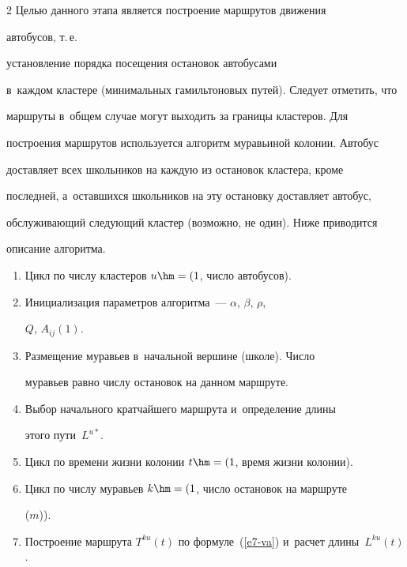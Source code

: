 \begin{multicols}{2}
     Целью данного этапа является построение маршрутов движения

автобусов, т.\,е.\

установление порядка посещения остановок автобусами

в~каж\-дом кластере (минимальных гамильтоновых путей). Следует отметить, что

маршруты в~общем случае могут выходить за границы кластеров. Для

по\-стро\-ения маршрутов используется алгоритм муравьиной колонии. Автобус

доставляет всех школьников на каждую из остановок кластера, кроме

последней, а~оставшихся школьников на эту остановку до\-став\-ля\-ет автобус,

обслуживающий следующий кластер (возможно, не один). Ниже приводится

описание алгоритма.

     \begin{enumerate}[1.]

\item Цикл по числу кластеров $u\hm= (1$, число автобусов).\\[-13.5pt]

\item Инициализация параметров алгоритма~--- $\alpha$, $\beta$, $\rho$,

$Q$, $A_{ij}(1)$.\\[-13.5pt]

\item Размещение муравьев в~начальной вершине (школе). Число

муравьев равно числу остановок на данном маршруте.\\[-13.5pt]

\item Выбор начального кратчайшего маршрута и~определение длины

этого пути~$L^{u*}$.\\[-13.5pt]

\item Цикл по времени жизни колонии $t\hm=(1$, время жизни колонии).\\[-13.5pt]

\item Цикл по числу муравьев $ k\hm = (1$, число остановок на маршруте

($m$)).\\[-13.5pt]

\item Построение маршрута $T^{ku}(t)$ по формуле~(\ref{e7-va}) и~расчет длины~$L^{ku}(t)$.\\[-13.5pt]


\end{enumerate}
\end{multicols}
